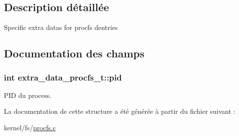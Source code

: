 \subsection{Description détaillée}
Specific extra datas for procfs dentries 

\subsection{Documentation des champs}
\hypertarget{structextra__data__procfs__t_ad501deb466cabf589b4617eac9bcce30}{
\subsubsection[{pid}]{\setlength{\rightskip}{0pt plus 5cm}int extra\-\_\-data\-\_\-procfs\-\_\-t\-::pid}}\label{structextra__data__procfs__t_ad501deb466cabf589b4617eac9bcce30}
P\-I\-D du process. 

La documentation de cette structure a été générée à partir du fichier suivant \-:\begin{DoxyCompactItemize}
\item 
kernel/fs/\hyperlink{procfs_8c}{procfs.\-c}\end{DoxyCompactItemize}

